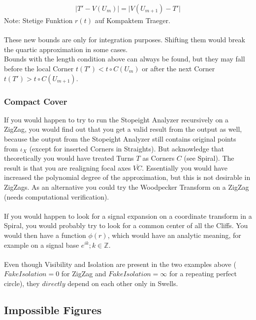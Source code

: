 \documentclass{report}
\begin{document}
\begin{align}
\lvert T' - V(U_{m}) \rvert = \lvert V(U_{m+1}) -T' \rvert\label{eq:2}
\end{align}
Note: Stetige Funktion $r(t)$ auf Kompaktem Traeger.\\\\
These new bounds are only for integration purposes. Shifting them would break the quartic approximation in some cases.\\
Bounds with the length condition above can always be found, but they may fall before the local Corner $t(T') < t\circ C(U_{m})$ or after the next Corner $t(T') > t\circ C(U_{m+1})$.  

\subsubsection*{Compact Cover}

If you would happen to try to run the Stopeight Analyzer recursively on a ZigZag, you would find out that you get a valid result from the output as well, because the output from the Stopeight Analyzer still contains original points from $\iota_{X}$ (except for inserted Corners in Straights). But acknowledge that theoretically you would have treated Turns $T$ as Corners $C$ (see Spiral). The result is that you are realigning focal axes $\overline{VC}$. Essentially you would have increased the polynomial degree of the approximation, but this is not desirable in ZigZags. As an alternative you could try the Woodpecker Transform \cite{Woodpecker} on a ZigZag (needs computational verification).\\\\
If you would happen to look for a signal expansion on a coordinate transform in a Spiral, you would probably try to look for a common center of all the Cliffs. You would then have a function $\phi (r)$, which would have an analytic meaning, for example on a signal base $e^{ik};k \in \mathbb{Z}$.\\\\
Even though Visibility and Isolation are present in the two examples above ($Fake Isolation=0$ for ZigZag and $Fake Isolation=\infty$ for a repeating perfect circle), they $directly$ depend on each other only in Swells.

\subsection{Impossible Figures}
\end{document}
